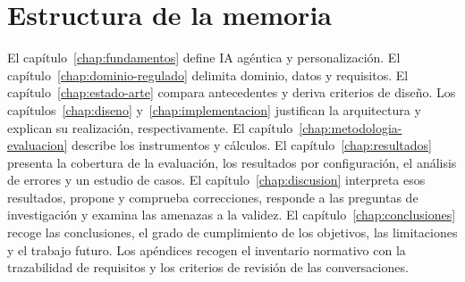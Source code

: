 \section{Estructura de la memoria}

El capítulo~\ref{chap:fundamentos} define IA agéntica y personalización.
El capítulo~\ref{chap:dominio-regulado} delimita dominio, datos y requisitos.
El capítulo~\ref{chap:estado-arte} compara antecedentes y deriva criterios de
diseño. Los capítulos~\ref{chap:diseno} y~\ref{chap:implementacion} justifican
la arquitectura y explican su realización, respectivamente. El
capítulo~\ref{chap:metodologia-evaluacion} describe los instrumentos y cálculos.
El capítulo~\ref{chap:resultados} presenta la cobertura de la evaluación, los
resultados por configuración, el análisis de errores y un estudio de casos. El
capítulo~\ref{chap:discusion} interpreta esos resultados, propone y comprueba
correcciones, responde a las preguntas de investigación y examina las amenazas
a la validez. El
capítulo~\ref{chap:conclusiones} recoge las conclusiones, el grado de
cumplimiento de los objetivos, las limitaciones y el trabajo futuro. Los
apéndices recogen el inventario normativo con la trazabilidad de requisitos y
los criterios de revisión de las conversaciones.
